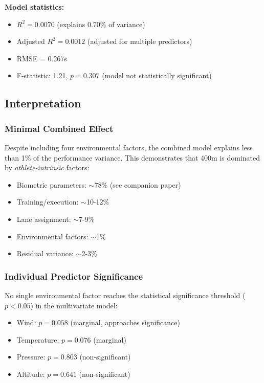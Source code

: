 \textbf{Model statistics:}
\begin{itemize}
    \item $R^2 = 0.0070$ (explains 0.70\% of variance)
    \item Adjusted $R^2 = 0.0012$ (adjusted for multiple predictors)
    \item RMSE = 0.267s
    \item F-statistic: 1.21, $p = 0.307$ (model not statistically significant)
\end{itemize}

\subsection{Interpretation}

\subsubsection{Minimal Combined Effect}

Despite including four environmental factors, the combined model explains less than 1\% of the performance variance. This demonstrates that 400m is dominated by \textit{athlete-intrinsic} factors:
\begin{itemize}
    \item Biometric parameters: $\sim$78\% (see companion paper)
    \item Training/execution: $\sim$10-12\%
    \item Lane assignment: $\sim$7-9\%
    \item Environmental factors: $\sim$1\%
    \item Residual variance: $\sim$2-3\%
\end{itemize}

\subsubsection{Individual Predictor Significance}

No single environmental factor reaches the statistical significance threshold ($p < 0.05$) in the multivariate model:
\begin{itemize}
    \item Wind: $p = 0.058$ (marginal, approaches significance)
    \item Temperature: $p = 0.076$ (marginal)
    \item Pressure: $p = 0.803$ (non-significant)
    \item Altitude: $p = 0.641$ (non-significant)
\end{itemize}

